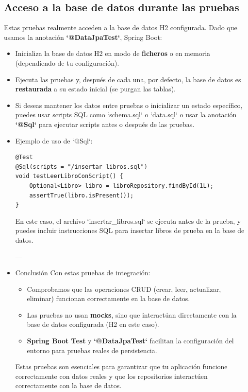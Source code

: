 \documentclass[11pt]{article}
\begin{document}
\subsection{Acceso a la base de datos durante las pruebas}
\label{sec:org565e7d3}
Estas pruebas realmente acceden a la base de datos H2 configurada. Dado que usamos la anotación \textbf{\textbf{`@DataJpaTest`}}, Spring Boot:
\begin{itemize}
\item Inicializa la base de datos H2 en modo de \textbf{\textbf{ficheros}} o en memoria (dependiendo de tu configuración).
\item Ejecuta las pruebas y, después de cada una, por defecto, la base de datos es \textbf{\textbf{restaurada}} a su estado inicial (se purgan las tablas).
\item Si deseas mantener los datos entre pruebas o inicializar un estado específico, puedes usar scripts SQL como `schema.sql` o `data.sql` o usar la anotación \textbf{\textbf{`@Sql`}} para ejecutar scripts antes o después de las pruebas.
\end{itemize}

\begin{itemize}
\item Ejemplo de uso de `@Sql`:
\label{sec:org4470e63}

\begin{verbatim}
@Test
@Sql(scripts = "/insertar_libros.sql")
void testLeerLibroConScript() {
    Optional<Libro> libro = libroRepository.findById(1L);
    assertTrue(libro.isPresent());
}
\end{verbatim}

En este caso, el archivo `insertar\_libros.sql` se ejecuta antes de la prueba, y puedes incluir instrucciones SQL para insertar libros de prueba en la base de datos.

---

\item Conclusión
\label{sec:org5e04260}
Con estas pruebas de integración:
\begin{itemize}
\item Comprobamos que las operaciones CRUD (crear, leer, actualizar, eliminar) funcionan correctamente en la base de datos.
\item Las pruebas no usan \textbf{\textbf{mocks}}, sino que interactúan directamente con la base de datos configurada (H2 en este caso).
\item \textbf{\textbf{Spring Boot Test}} y \textbf{\textbf{`@DataJpaTest`}} facilitan la configuración del entorno para pruebas reales de persistencia.
\end{itemize}

Estas pruebas son esenciales para garantizar que tu aplicación funcione correctamente con datos reales y que los repositorios interactúen correctamente con la base de datos.
\end{itemize}
\end{document}

